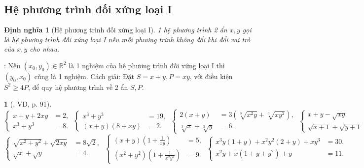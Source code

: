 \documentclass{article}
\newtheorem{baitoan}{}
\newtheorem{dinhnghia}{Định nghĩa}
\begin{document}
\subsection{Hệ phương trình đối xứng loại I}

\begin{dinhnghia}[Hệ phương trình đối xứng loại I]
	1 hệ phương trình 2 ẩn $x,y$ gọi là {hệ phương trình đối xứng loại I} nếu mỗi phương trình không đổi khi đổi vai trò của $x,y$ cho nhau.
\end{dinhnghia}
: Nếu $(x_0,y_0)\in\mathbb{R}^2$ là 1 nghiệm của hệ phương trình đối xứng loại I thì $(y_0,x_0)$ cũng là 1 nghiệm. {\sf Cách giải}: Đặt $S = x + y,P = xy$, với điều kiện $S^2\ge4P$, để quy hệ phương trình về 2 ẩn $S,P$.

\begin{baitoan}[\cite{Kien_dai_so_9}, VD, p. 91]
	\begin{equation*}
		\left\{\begin{split}
			x + y + 2xy &= 2,\\
			x^3 + y^3 &= 8.
		\end{split}\right.\ \left\{\begin{split}
			x^3 + y^3 &= 19,\\
			(x + y)(8 + xy) &= 2.
		\end{split}\right.\ \left\{\begin{split}
			2(x + y) &= 3(\sqrt[3]{x^2y} + \sqrt[3]{xy^2}),\\
			\sqrt[3]{x} + \sqrt[3]{y} &= 6.
		\end{split}\right.\ \left\{\begin{split}
			x + y - \sqrt{xy} &= 3,\\
			\sqrt{x + 1} + \sqrt{y + 1} &= 4.
		\end{split}\right.
	\end{equation*}
	\begin{equation*}
		\left\{\begin{split}
			\sqrt{x^2 + y^2} + \sqrt{2xy} &= 8\sqrt{2},\\
			\sqrt{x} + \sqrt{y} &= 4.
		\end{split}\right.\ \left\{\begin{split}
			(x + y)\left(1 + \frac{1}{xy}\right) &= 5,\\
			(x^2 + y^2)\left(1 + \frac{1}{x^2y^2}\right) &= 9.
		\end{split}\right.\ \left\{\begin{split}
			x^3y(1 + y) + x^2y^2(2 + y) + xy^3 &= 30,\\
			x^2y + x(1 + y + y^2) + y &= 11.
		\end{split}\right.
	\end{equation*}	
\end{baitoan}
\end{document}

